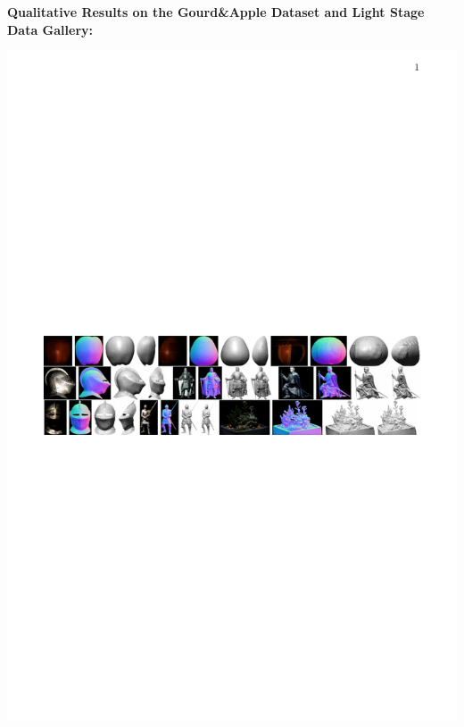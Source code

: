 {    \vspace{0.8em}
    \textbf{\color{sufered}Qualitative Results on the Gourd\&Apple Dataset and Light Stage Data Gallery:}
    \vspace{-0.8em}
    \begin{center}
        \includegraphics[width=1\textwidth]{images/gourd_stage}
    \end{center}

}
